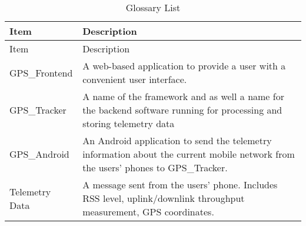 \begin{longtable}[]{@{}ll@{}}
\caption{Glossary List}\tabularnewline
\toprule
\begin{minipage}[b]{0.24\columnwidth}\raggedright
Item\strut
\end{minipage} & \begin{minipage}[b]{0.71\columnwidth}\raggedright
Description\strut
\end{minipage}\tabularnewline
\midrule
\endfirsthead
\toprule
\begin{minipage}[b]{0.24\columnwidth}\raggedright
Item\strut
\end{minipage} & \begin{minipage}[b]{0.71\columnwidth}\raggedright
Description\strut
\end{minipage}\tabularnewline
\midrule
\endhead
\begin{minipage}[t]{0.24\columnwidth}\raggedright
GPS\_Frontend\strut
\end{minipage} & \begin{minipage}[t]{0.71\columnwidth}\raggedright
A web-based application to provide a user with a convenient user
interface.\strut
\end{minipage}\tabularnewline
\begin{minipage}[t]{0.24\columnwidth}\raggedright
GPS\_Tracker\strut
\end{minipage} & \begin{minipage}[t]{0.71\columnwidth}\raggedright
A name of the framework and as well a name for the backend software
running for processing and storing telemetry data\strut
\end{minipage}\tabularnewline
\begin{minipage}[t]{0.24\columnwidth}\raggedright
GPS\_Android\strut
\end{minipage} & \begin{minipage}[t]{0.71\columnwidth}\raggedright
An Android application to send the telemetry information about the
current mobile network from the users' phones to GPS\_Tracker.\strut
\end{minipage}\tabularnewline
\begin{minipage}[t]{0.24\columnwidth}\raggedright
Telemetry Data\strut
\end{minipage} & \begin{minipage}[t]{0.71\columnwidth}\raggedright
A message sent from the users' phone. Includes RSS level,
uplink/downlink throughput measurement, GPS coordinates.\strut
\end{minipage}\tabularnewline

\end{longtable}
